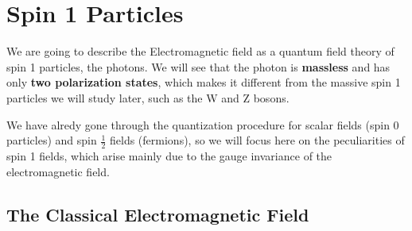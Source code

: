 \chapter{Spin 1 Particles}

We are going to describe the Electromagnetic field as a quantum field theory of spin 1 particles, the photons. We will see that the photon is \textbf{massless} and has only \textbf{two polarization states}, which makes it different from the massive spin 1 particles we will study later, such as the W and Z bosons.

We have alredy gone through the quantization procedure for scalar fields (spin 0 particles) and spin \(\frac{1}{2}\) fields (fermions), so we will focus here on the peculiarities of spin 1 fields, which arise mainly due to the gauge invariance of the electromagnetic field.

\section{The Classical Electromagnetic Field}

